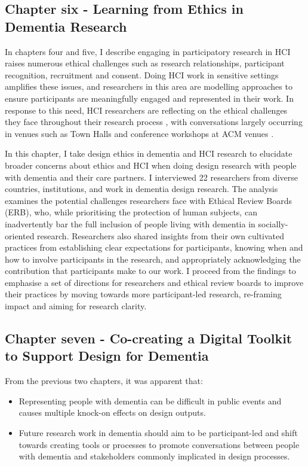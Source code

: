 \subsection{Chapter six - Learning from Ethics in Dementia Research}
\label{Intro:ChapterSix}
In chapters four and five, I describe engaging in participatory research in HCI raises numerous ethical challenges such as research relationships, participant recognition, recruitment and consent. Doing HCI work in sensitive settings amplifies these issues, and researchers in this area are modelling approaches to ensure participants are meaningfully engaged and represented in their work. In response to this need, HCI researchers are reflecting on the ethical challenges they face throughout their research process \citep{vines_designing_2013}, with conversations largely occurring in venues such as Town Halls \citep{munteanu_sigchi_2019,bruckman_cscw_2017} and conference workshops at ACM venues \citep{davis_ethical_2015,waycott_challenge_2015}.

In this chapter, I take design ethics in dementia and HCI research to elucidate broader concerns about ethics and HCI when doing design research with people with dementia and their care partners. I interviewed 22 researchers from diverse countries, institutions, and work in dementia design research. The analysis examines the potential challenges researchers face with Ethical Review Boards (ERB), who, while prioritising the protection of human subjects, can inadvertently bar the full inclusion of people living with dementia in socially-oriented research. Researchers also shared insights from their own cultivated practices from establishing clear expectations for participants, knowing when and how to involve participants in the research, and appropriately acknowledging the contribution that participants make to our work. I proceed from the findings to emphasise a set of directions for researchers and ethical review boards to improve their practices by moving towards more participant-led research, re-framing impact and aiming for research clarity.

\subsection{Chapter seven - Co-creating a Digital Toolkit to Support Design for Dementia}
\label{Intro:ChapterSeven}
From the previous two chapters, it was apparent that: 
\begin{itemize}
\item Representing people with dementia can be difficult in public events and causes multiple knock-on effects on design outputs.
\item Future research work in dementia should aim to be participant-led and shift towards creating tools or processes to promote conversations between people with dementia and stakeholders commonly implicated in design processes.
\end{itemize}

